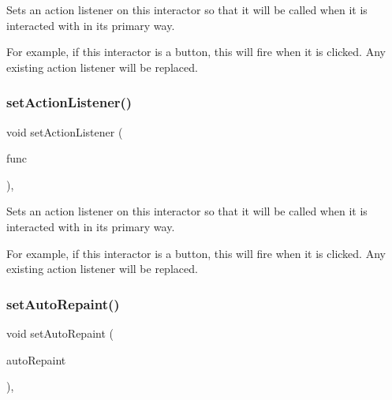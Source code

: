Sets an action listener on this interactor so that it will be called when it is interacted with in its primary way. 

For example, if this interactor is a button, this will fire when it is clicked. Any existing action listener will be replaced. \mbox{\label{classsgl_1_1GInteractor_aebd20a89c7a8a43a6fce999cf4f9fcf2}} 
\subsubsection{\texorpdfstring{set\+Action\+Listener()}{setActionListener()}\hspace{0.1cm}{\footnotesize\ttfamily [2/2]}}
{\footnotesize\ttfamily void set\+Action\+Listener (\begin{DoxyParamCaption}\item[{\mbox{\hyperlink{namespacesgl_a54427ce97bb1c2804e4fe2b0a62e8b17}{G\+Event\+Listener\+Void}}}]{func }\end{DoxyParamCaption})\hspace{0.3cm}{\ttfamily [virtual]}, {\ttfamily [inherited]}}



Sets an action listener on this interactor so that it will be called when it is interacted with in its primary way. 

For example, if this interactor is a button, this will fire when it is clicked. Any existing action listener will be replaced. \mbox{\label{classsgl_1_1GCanvas_acb65220cc16d17df02a0c08d35b60988}} 
\subsubsection{\texorpdfstring{set\+Auto\+Repaint()}{setAutoRepaint()}}
{\footnotesize\ttfamily void set\+Auto\+Repaint (\begin{DoxyParamCaption}\item[{bool}]{auto\+Repaint }\end{DoxyParamCaption})\hspace{0.3cm}{\ttfamily [override]}, {\ttfamily [virtual]}}




